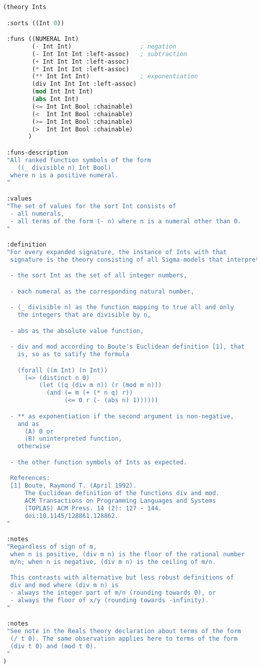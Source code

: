 \documentclass{article}
\begin{document}
\begin{lstlisting}[language=Lisp]
(theory Ints

 :sorts ((Int 0))

 :funs ((NUMERAL Int)
        (- Int Int)                   ; negation
        (- Int Int Int :left-assoc)   ; subtraction
        (+ Int Int Int :left-assoc)
        (* Int Int Int :left-assoc)
        (** Int Int Int)              ; exponentiation
        (div Int Int Int :left-assoc)
        (mod Int Int Int)
        (abs Int Int)
        (<= Int Int Bool :chainable)
        (<  Int Int Bool :chainable)
        (>= Int Int Bool :chainable)
        (>  Int Int Bool :chainable)
       )

 :funs-description
 "All ranked function symbols of the form
    ((_ divisible n) Int Bool)
  where n is a positive numeral.
 "

 :values
 "The set of values for the sort Int consists of
  - all numerals,
  - all terms of the form (- n) where n is a numeral other than 0.
 "

 :definition
 "For every expanded signature, the instance of Ints with that
  signature is the theory consisting of all Sigma-models that interpret:

  - the sort Int as the set of all integer numbers,

  - each numeral as the corresponding natural number,

  - (_ divisible n) as the function mapping to true all and only
    the integers that are divisible by n,

  - abs as the absolute value function,

  - div and mod according to Boute's Euclidean definition [1], that
    is, so as to satify the formula

    (forall ((m Int) (n Int))
      (=> (distinct n 0)
          (let ((q (div m n)) (r (mod m n)))
            (and (= m (+ (* n q) r))
                 (<= 0 r (- (abs n) 1))))))

  - ** as exponentiation if the second argument is non-negative,
    and as
      (A) 0 or
      (B) uninterpreted function,
    otherwise

  - the other function symbols of Ints as expected.

  References:
  [1] Boute, Raymond T. (April 1992).
      The Euclidean definition of the functions div and mod.
      ACM Transactions on Programming Languages and Systems
      (TOPLAS) ACM Press. 14 (2): 127 - 144.
      doi:10.1145/128861.128862.
 "

 :notes
 "Regardless of sign of m,
  when n is positive, (div m n) is the floor of the rational number
  m/n; when n is negative, (div m n) is the ceiling of m/n.

  This contrasts with alternative but less robust definitions of
  div and mod where (div m n) is
  - always the integer part of m/n (rounding towards 0), or
  - always the floor of x/y (rounding towards -infinity).
 "

 :notes
 "See note in the Reals theory declaration about terms of the form
  (/ t 0). The same observation applies here to terms of the form
  (div t 0) and (mod t 0).
 "
)

\end{lstlisting}
\end{document}
